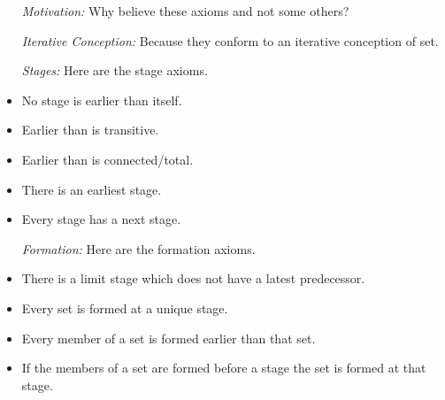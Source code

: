 \documentclass[a4paper, 11pt]{article} %
\begin{document}
\begin{itemize}
  \item[\it Motivation:] Why believe these axioms and not some others?
  \item[\it Iterative Conception:] Because they conform to an iterative conception of set.
  \item[\it Stages:] Here are the stage axioms.
    \item No stage is earlier than itself.
    \item Earlier than is transitive.
    \item Earlier than is connected/total.
    \item There is an earliest stage.
    \item Every stage has a next stage.
  \item[\it Formation:] Here are the formation axioms.
    \item There is a limit stage which does not have a latest predecessor.
    \item Every set is formed at a unique stage.
    \item Every member of a set is formed earlier than that set.
    \item If the members of a set are formed before a stage the set is formed at that stage.
\end{itemize}
\end{document}
